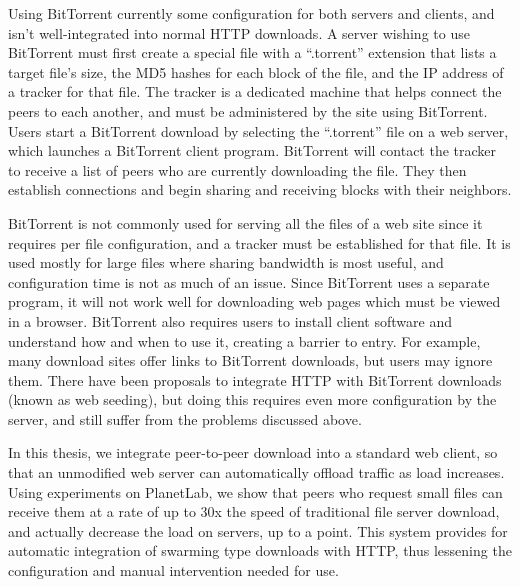 Using BitTorrent currently some configuration for both servers and clients, and isn't well-integrated into normal HTTP downloads.  A server wishing to use BitTorrent 
must first create a special file with a ``.torrent'' extension that lists a target file's size, the MD5 hashes for each block of the file, and 
the IP address of a tracker for that file.  The tracker is a dedicated machine that helps connect the peers to each another, and must be administered
by the site using BitTorrent.  Users start a BitTorrent download by selecting the ``.torrent'' file on a web server, which launches a BitTorrent client program.
BitTorrent will contact the tracker to receive a list of peers who are currently downloading the file.  They then establish connections and begin sharing and receiving blocks with their neighbors.


BitTorrent is not commonly used for serving all the files of a web site since it requires per file configuration, and a tracker must be established for that file.  It is used mostly for large files where sharing
bandwidth is most useful, and configuration time is not as much of an issue.  Since BitTorrent uses a separate program, it will not work well for downloading web pages which must be viewed in a browser.  
BitTorrent also requires users to install client software and understand how and when to use it, creating a barrier to entry.  For example, many download sites offer links to BitTorrent downloads,
but users may ignore them.  There have been proposals to integrate HTTP with BitTorrent downloads (known as web seeding), but doing this requires even more configuration by the server, and still suffer from the problems
discussed above.

In this thesis, we integrate peer-to-peer download into a standard web client, so that an unmodified web server can automatically offload traffic as load increases. 
Using experiments on PlanetLab, we show that peers who request small files can receive them at a rate of up to 30x the speed of traditional file server download, and
actually decrease the load on servers, up to a point. This system provides for automatic integration of swarming type downloads with HTTP, thus lessening the configuration
and manual intervention needed for use.

